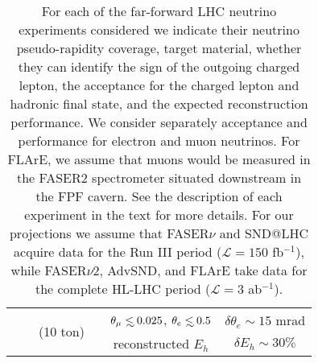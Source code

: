 \begin{table}[t]
\begin{tabularx}{\textwidth}{Xccccc}
&   &  \multirow{2}{*}{(10 ton)}   &   & $\theta_\mu \lsim 0.025$, $\theta_e \lsim 0.5$ &    $\delta \theta_e \sim 15 $ mrad   \\
 &   &     &  & reconstructed $E_h$  &    $\delta E_h \sim 30\% $   \\
  \bottomrule
\end{tabularx}
\vspace{0.2cm}
\caption{\small For each of the far-forward LHC neutrino experiments considered
   we indicate their neutrino pseudo-rapidity coverage, target material, whether
  they can identify the sign of the outgoing charged lepton,
  the acceptance for the charged lepton and hadronic final state,
  and the expected reconstruction performance.
  We consider separately acceptance and performance for electron and muon
  neutrinos.
  For FLArE, we assume that muons would be measured in the FASER2 spectrometer
  situated downstream in the FPF cavern.
  See the description of each experiment in the text for more details.
  For our projections we assume that FASER$\nu$ and SND@LHC acquire data
  for the Run III period ($\mathcal{L}=150$ fb$^{-1}$), while FASER$\nu$2, AdvSND, and FLArE take data
  for the complete HL-LHC period ($\mathcal{L}=3$ ab$^{-1}$).
  \label{tab:FPF_experiments}
}
\end{table}
